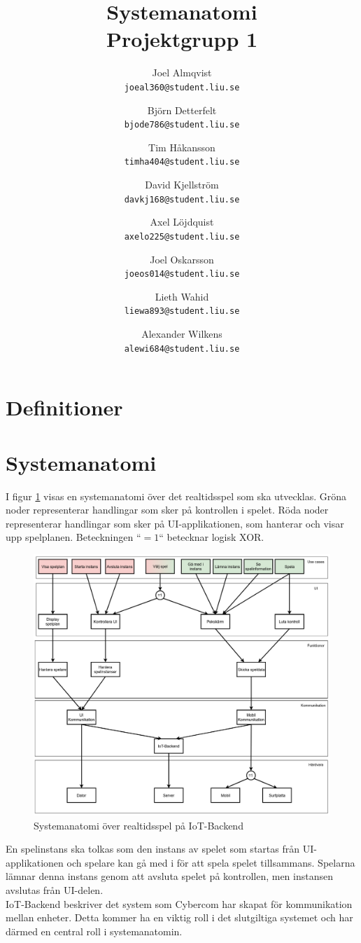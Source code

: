 \documentclass[10pt]{article}
\title{Systemanatomi\\
    \large Projektgrupp 1}
\author{
    Joel Almqvist\\
    \texttt{joeal360@student.liu.se}
    \and
    Björn Detterfelt\\
    \texttt{bjode786@student.liu.se}
    \and
    Tim Håkansson\\
    \texttt{timha404@student.liu.se}
    \and
    David Kjellström\\
    \texttt{davkj168@student.liu.se}
    \and
    Axel Löjdquist\\
    \texttt{axelo225@student.liu.se}
    \and
    Joel Oskarsson\\
    \texttt{joeos014@student.liu.se}
    \and
    Lieth Wahid\\
    \texttt{liewa893@student.liu.se}
    \and
    Alexander Wilkens\\
    \texttt{alewi684@student.liu.se}
}
\begin{document}
	\maketitle
  \pagebreak	
	\tableofcontents

	\pagebreak
	
	\section{Definitioner}
  \begin{itemize}[leftmargin=5cm]
	\end{itemize}
	
	\section{Systemanatomi}	
		I figur \ref{fig:graf} visas en systemanatomi över det realtidsspel som ska utvecklas. Gröna noder representerar handlingar som sker på kontrollen i spelet. Röda noder representerar handlingar som sker på UI-applikationen, som hanterar och visar upp spelplanen. Beteckningen ``$= 1$`` betecknar logisk XOR.\\
	
		\begin{figure}[h]
			\centering
			\includegraphics[scale=0.4]{systemanatomi_graf}
			\caption{Systemanatomi över realtidsspel på IoT-Backend}
			\label{fig:graf}
		\end{figure}	
	\pagebreak
	En spelinstans ska tolkas som den instans av spelet som startas från UI-applikationen och spelare kan gå med i för att spela spelet tillsammans. Spelarna lämnar denna instans genom att avsluta spelet på kontrollen, men instansen avslutas från UI-delen.\\
	
	IoT-Backend beskriver det system som Cybercom har skapat för kommunikation mellan enheter. Detta kommer ha en viktig roll i det slutgiltiga systemet och har därmed en central roll i systemanatomin.\\
	
\end{document}
